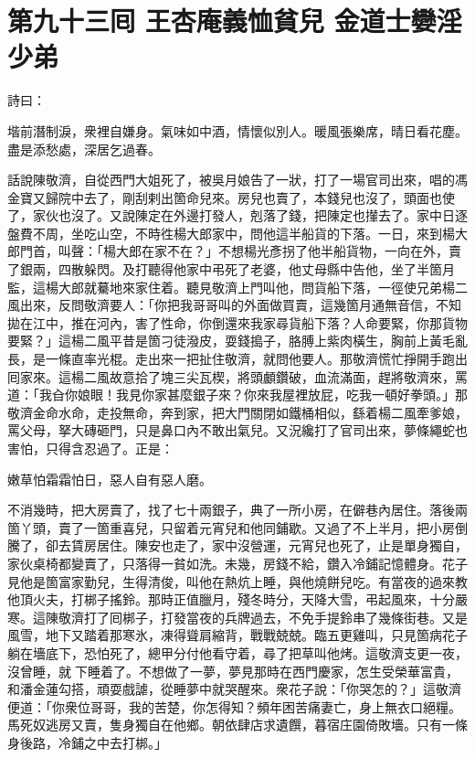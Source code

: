
\chapter*{第九十三囘 王杏庵義恤貧兒 金道士孌淫少弟}


詩曰：

堦前潛制淚，衆裡自嫌身。氣味如中酒，情懷似別人。暖風張樂席，晴日看花塵。盡是添愁處，深居乞過春。

話說陳敬濟，自從西門大姐死了，被吳月娘告了一狀，打了一場官司出來，唱的馮金寶又歸院中去了，剛刮剌出箇命兒來。{}房兒也賣了，本錢兒也沒了，頭面也使了，家伙也沒了。又說陳定在外邊打發人，剋落了錢，把陳定也攆去了。家中日逐盤費不周，坐吃山空，不時徃楊大郎家中，問他這半船貨的下落。一日，來到楊大郎門首，叫聲：「楊大郎在家不在？」不想楊光彥拐了他半船貨物，一向在外，賣了銀兩，四散躲閃。及打聽得他家中弔死了老婆，他丈母縣中告他，坐了半箇月監，這楊大郎就驀地來家住着。聽見敬濟上門叫他，問貨船下落，一徑使兄弟楊二風出來，反問敬濟要人：「你把我哥哥叫的外面做買賣，這幾箇月通無音信，不知拋在江中，推在河內，害了性命，你倒還來我家尋貨船下落？人命要緊，你那貨物要緊？」這楊二風平昔是箇刁徒潑皮，耍錢搗子，胳膊上紫肉橫生，胸前上黃毛亂長，是一條直率光棍。走出來一把扯住敬濟，就問他要人。那敬濟慌忙掙開手跑出囘家來。這楊二風故意拾了塊三尖瓦楔，將頭顱鑽破，血流滿面，趕將敬濟來，罵道：「我㒲你娘眼！我見你家甚麼銀子來？你來我屋裡放屁，吃我一頓好拳頭。」那敬濟金命水命，走投無命，奔到家，把大門關閉如鐵桶相似，繇着楊二風牽爹娘，罵父母，拏大磚砸門，只是鼻口內不敢出氣兒。又況纔打了官司出來，夢條繩蛇也害怕，只得含忍過了。正是：

嫩草怕霜霜怕日，惡人自有惡人磨。

不消幾時，把大房賣了，找了七十兩銀子，典了一所小房，在僻巷內居住。落後兩箇丫頭，賣了一箇重喜兒，只留着元宵兒和他同鋪歇。又過了不上半月，把小房倒騰了，卻去賃房居住。陳安也走了，家中沒營運，元宵兒也死了，止是單身獨自，家伙桌椅都變賣了，只落得一貧如洗。{}未幾，房錢不給，鑽入冷鋪記憶體身。花子見他是箇富家勤兒，生得清俊，叫他在熱炕上睡，與他燒餅兒吃。有當夜的過來教他頂火夫，打梆子搖鈴。那時正值臘月，殘冬時分，天降大雪，弔起風來，十分嚴寒。這陳敬濟打了囘梆子，打發當夜的兵牌過去，不免手提鈴串了幾條街巷。又是風雪，地下又踏着那寒氷，凍得聳肩縮背，戰戰兢兢。臨五更雞叫，只見箇病花子躺在墻底下，恐怕死了，總甲分付他看守着，尋了把草叫他烤。這敬濟支更一夜，沒曾睡，就𢱉下睡着了。不想做了一夢，夢見那時在西門慶家，怎生受榮華富貴，和潘金蓮勾搭，頑耍戲謔，從睡夢中就哭醒來。衆花子說：「你哭怎的？」這敬濟便道：「你衆位哥哥，我的苦楚，你怎得知？頻年困苦痛妻亡，身上無衣口絕糧。馬死奴逃房又賣，隻身獨自在他鄉。朝依肆店求遺饌，暮宿庄園倚敗墻。只有一條身後路，冷鋪之中去打梆。」

